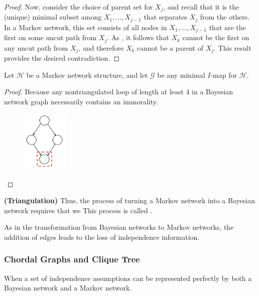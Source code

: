 \documentclass{article}
\newcommand{\bfs}[1]{\textbf{({#1}) }}
\begin{document}
\begin{proof}
Now, consider the choice of parent set for $X_{j}$, and recall that it is the (unique) minimal subset among $X_{1}, \ldots, X_{j-1}$ that separates $X_{j}$ from the others. In a Markov network, this set consists of all nodes in $X_{1}, \ldots, X_{j-1}$ that are the first on some uncut path from $X_{j} .$ As , it follows that $X_{k}$ cannot be the first on any uncut path from $X_{j}$, and therefore $X_{k}$ cannot be a parent of $X_{j} .$ This result provides the desired contradiction.
\end{proof}

\begin{cora}\label{cor:ajdc}
Let $\mathcal{H}$ be a Markov network structure, and let $\mathcal{G}$ be any minimal $I$-map for $\mathcal{H} .$ 
\end{cora}
\begin{proof}
Because any nontriangulated loop of length at least 4 in a Bayesian network graph necessarily contains an immorality. 
\begin{figure}[H]
    \centering
    \includegraphics[width=0.2\textwidth]{Figs/a14.png}
    \end{figure}
\end{proof}
\begin{defa}\bfs{Triangulation}
Thus, the process of turning a Markov network into a Bayesian network requires that we  This process is called . 
\end{defa}
\begin{rema}
As in the transformation from Bayesian networks to Markov networks, the addition of edges leads to the loss of independence information. 
\end{rema}
\subsubsection{Chordal Graphs and Clique Tree}
 When a set of independence assumptions can be represented perfectly by both a Bayesian network and a Markov network.
\end{document}
